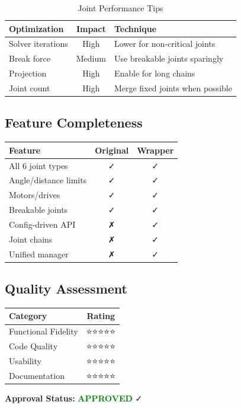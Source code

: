 \begin{table}[h]
\centering
\begin{tabular}{|l|c|l|}
\hline
\textbf{Optimization} & \textbf{Impact} & \textbf{Technique} \\
\hline
Solver iterations & High & Lower for non-critical joints \\
Break force & Medium & Use breakable joints sparingly \\
Projection & High & Enable for long chains \\
Joint count & High & Merge fixed joints when possible \\
\hline
\end{tabular}
\caption{Joint Performance Tips}
\end{table}


\subsection{Feature Completeness}

\begin{table}[h]
\centering
\begin{tabular}{|l|c|c|}
\hline
\textbf{Feature} & \textbf{Original} & \textbf{Wrapper} \\
\hline
All 6 joint types & ✓ & ✓ \\
Angle/distance limits & ✓ & ✓ \\
Motors/drives & ✓ & ✓ \\
Breakable joints & ✓ & ✓ \\
Config-driven API & ✗ & ✓ \\
Joint chains & ✗ & ✓ \\
Unified manager & ✗ & ✓ \\
\hline
\end{tabular}
\end{table}


\subsection{Quality Assessment}

\begin{table}[h]
\centering
\begin{tabular}{|l|c|}
\hline
\textbf{Category} & \textbf{Rating} \\
\hline
Functional Fidelity & ⭐⭐⭐⭐⭐ \\
Code Quality & ⭐⭐⭐⭐⭐ \\
Usability & ⭐⭐⭐⭐⭐ \\
Documentation & ⭐⭐⭐⭐⭐ \\
\hline
\end{tabular}
\end{table}

\textbf{Approval Status:} \textcolor{green}{\textbf{APPROVED}} ✓

